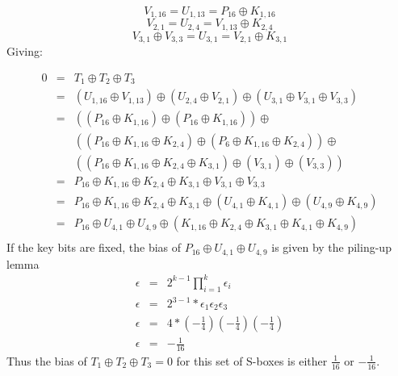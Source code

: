 \documentclass{elsart}
\begin{document}
$$V_{1,16} = U_{1,13} = P_{16} \oplus K_{1,16}$$
$$V_{2,1} = U_{2,4} = V_{1,13} \oplus K_{2,4}$$
$$V_{3,1} \oplus V_{3,3} = U_{3,1} = V_{2,1} \oplus K_{3,1}$$
Giving:

\begin{eqnarray*}
0 &=& T_{1} \oplus T_{2} \oplus T_{3} \\
    &=& (U_{1,16} \oplus V_{1,13}) \oplus  (U_{2,4} \oplus V_{2,1}) 
            \oplus (U_{3,1} \oplus V_{3,1} \oplus V_{3,3}) \\
    &=& ((P_{16} \oplus K_{1,16}) 
            \oplus (P_{16} \oplus K_{1,16})) \oplus \\
    & & ((P_{16} \oplus K_{1,16} \oplus K_{2,4}) 
            \oplus (P_{6} \oplus K_{1,16} \oplus K_{2,4})) \oplus \\
    & & ((P_{16} \oplus K_{1,16} \oplus K_{2,4} \oplus K_{3,1}) 
            \oplus (V_{3,1}) \oplus (V_{3,3})) \\
    &=& P_{16} \oplus K_{1,16} \oplus K_{2,4} \oplus K_{3,1} 
            \oplus V_{3,1} \oplus V_{3,3} \\
    &=& P_{16} \oplus K_{1,16} \oplus K_{2,4} \oplus K_{3,1}
            \oplus (U_{4,1} \oplus K_{4,1}) 
            \oplus (U_{4,9} \oplus K_{4,9}) \\
    &=& P_{16} \oplus U_{4,1} \oplus U_{4,9} 
            \oplus (K_{1,16} \oplus K_{2,4} \oplus K_{3,1} 
            \oplus K_{4,1} \oplus K_{4,9}) \\
\end{eqnarray*}
If the key bits are fixed, the bias of $P_{16} \oplus U_{4,1} \oplus U_{4,9}$
is given by the piling-up lemma 
\begin{eqnarray*}
\epsilon &=& 2^{k-1} \displaystyle\prod_{i=1}^k \epsilon_{i} \\
\epsilon &=& 2^{3-1} * \epsilon_{1}\epsilon_{2}\epsilon_{3} \\
\epsilon &=& 4 * (-\frac{1}{4})(-\frac{1}{4})(-\frac{1}{4}) \\
\epsilon &=& -\frac{1}{16}
\end{eqnarray*}
Thus the bias of $T_{1} \oplus T_{2} \oplus T_{3} = 0$ for this set of S-boxes 
is either $\frac{1}{16}$ or $-\frac{1}{16}$.

\newpage
\end{document}
